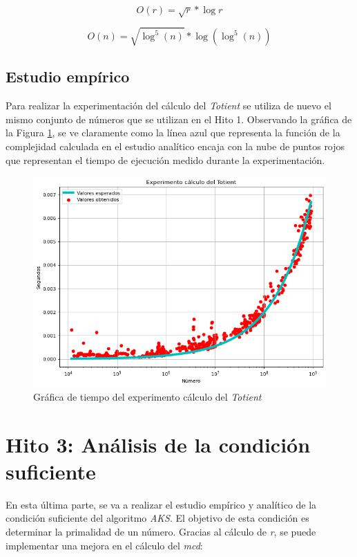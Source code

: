 \documentclass{uc3mpracticas}
\begin{document}
  $$ O(r) = \sqrt{r} * \log r $$

  $$ O(n) = \sqrt{\log^5(n)} * \log (\log^5(n)) $$



  \subsection{Estudio empírico}

  Para realizar la experimentación del cálculo del \textit{Totient} se utiliza de nuevo el mismo conjunto de números que se utilizan en el Hito 1. Observando la gráfica de la Figura \ref{fig:totient}, se ve claramente como la línea azul que representa la función de la complejidad calculada en el estudio analítico encaja con la nube de puntos rojos que representan el tiempo de ejecución medido durante la experimentación.


  \begin{figure}[!h]
    \centering
    \includegraphics[width=.8\linewidth]{./Images/totient.png}
    \caption{Gráfica de tiempo del experimento cálculo del \textit{Totient}}
    \label{fig:totient}
  \end{figure}




  \section{Hito 3: Análisis de la condición suficiente}

  En esta última parte, se va a realizar el estudio empírico y analítico de la condición suficiente del algoritmo \textit{AKS}. El objetivo de esta condición es determinar la primalidad de un número. Gracias al cálculo de \textit{r}, se puede implementar una mejora en el cálculo del \textit{mcd}:
\end{document}
